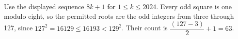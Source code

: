 Use the displayed sequence $8k+1$ for $1\le k\le2024$. Every odd square is one modulo eight, so the permitted roots are the odd integers from three through 127, since $127^2=16129\le16193<129^2$. Their count is $\dfrac{(127-3)}{2}+1=\boxed{63}$.
